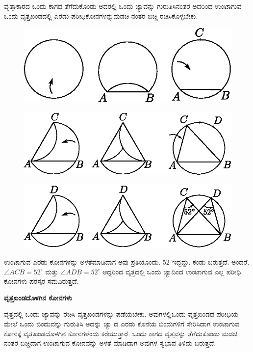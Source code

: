  ವೃತ್ತಾಕಾರದ ಒಂದು ಕಾಗದ ತೆಗೆದುಕೊಂಡು ಅದರಲ್ಲಿ ಒಂದು ಜ್ಯಾವನ್ನು ಗುರುತಿಸಿ\break ನಂತರ ಅದರಿಂದ ಉಂಟಾಗುವ ಒಂದು ವೃತ್ತಖಂಡದಲ್ಲಿ ಎರಡು ಪರೀಧಿಕೋನಗಳನ್ನು\break ಮಡಚಿ ನಂತರ ಬಿಚ್ಚಿ ರಚಿಸಿಕೊಳ್ಳಬೇಕು.
 \begin{figure}[H]
\centering
\includegraphics[scale=.98]{src/figure/chap1/fig1-28a.eps}
\end{figure}
 \begin{figure}[H]
\centering
\includegraphics[scale=.98]{src/figure/chap1/fig1-28b.eps}
\end{figure}
\begin{figure}[H]
\centering
\includegraphics[scale=.98]{src/figure/chap1/fig1-28c.eps}
\end{figure}

 ಉಂಟಾಗುವ ಎರಡು ಕೋನಗಳನ್ನು ಅಳತೆಮಾಡಿದಾಗ ಅವು ಪ್ರತಿಯೊಂದು. $52^\circ$\break ಇದ್ದದ್ದು. ಕಂಡು ಬರುತ್ತದೆ. ಅಂದರೆ. $\angle ACB = 52^\circ$ ಮತ್ತು  $\angle ADB = 52^\circ$ ಆದ್ದರಿಂದ ವೃತ್ತದಲ್ಲಿ ಒಂದು ಜ್ಯಾದಿಂದ ಉಂಟಾಗುವ ಎಲ್ಲ ಪರೀಧಿ ಕೋನಗಳು ಪರಸ್ಪರ ಸಮವಿರುತ್ತದೆ. 
 
 \noindent
  \textbf{ವೃತ್ತಖಂಡದೊಳಗಿನ ಕೋನಗಳು}
  
  ವೃತ್ತದಲ್ಲಿ ಒಂದು ಜ್ಯಾವನ್ನು ರಚಿಸಿ ವೃತ್ತಖಂಡಗಳನ್ನು ಪಡೆಯಬೇಕು. ಅವುಗಳಲ್ಲಿ\break ಒಂದು ವೃತ್ತಖಂಡದ ಪರೀಧಿಯ ಮೇಲೆ ಒಂದು ಬಿಂದುವನ್ನು ಗುರುತಿಸಿ ಅದನ್ನು ಜ್ಯಾ ದ ಎರಡು ಕೊನೆಯ ಬಿಂದುಗಳಿಗೆ ಸೇರಿಸಿದಾಗ ಉಂಟಾಗುವ ಕೋನಕ್ಕೆ ವೃತ್ತಖಂಡದೊಳಗಿನ ಕೋನಗಳೆಂದು ಕರೆಯುತ್ತಾರೆ. ಒಂದು ಕಾಗದ ವೃತ್ತವನ್ನು ತೆಗೆದುಕೊಂಡು ಮಡಚಿ ನಂತರ ಬಿಚ್ಚಿದಾಗ ಉಂಟಾಗುವ ಕೋನವನ್ನು ಅಳತೆ ಮಾಡಿದಾಗ ಅವುಗಳ ಸ್ವಭಾವ ತಿಳಿದು ಬರುತ್ತದೆ. 
  
